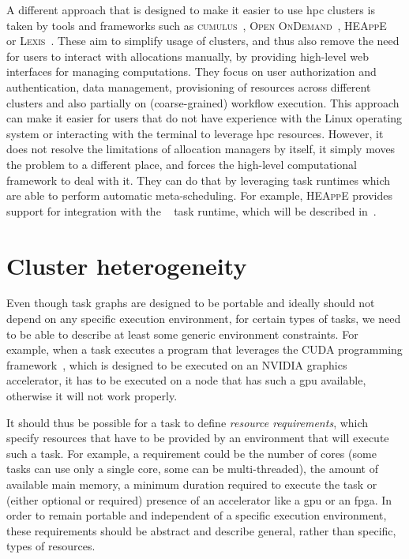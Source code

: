 A different approach that is designed to make it easier to use \gls{hpc} clusters is
taken by tools and frameworks such as \textsc{cumulus}~\cite{cumulus},
\textsc{Open OnDemand}~\cite{openondemand}, \textsc{HEAppE}~\cite{heappe} or
\textsc{Lexis}~\cite{lexis}. These aim to simplify usage of clusters, and thus
also remove the need for users to interact with allocations manually, by providing high-level web
interfaces for managing computations. They focus on user authorization and authentication, data
management, provisioning of resources across different clusters and also partially on
(coarse-grained) workflow execution. This approach can make it easier for users that do not have
experience with the Linux operating system or interacting with the terminal to leverage
\gls{hpc} resources. However, it does not resolve the limitations of allocation
managers by itself, it simply moves the problem to a different place, and forces the high-level
computational framework to deal with it. They can do that by leveraging task runtimes which are
able to perform automatic meta-scheduling. For example, \textsc{HEAppE} provides support
for integration with the \hyperqueue{}~\cite{heappe_hq} task runtime, which will
be described in~.

\section{Cluster heterogeneity}
Even though task graphs are designed to be portable and ideally should not depend on any specific
execution environment, for certain types of tasks, we need to be able to describe at least some
generic environment constraints. For example, when a task executes a program that leverages the
CUDA programming framework~\cite{cuda}, which is designed to be executed on an NVIDIA
graphics accelerator, it has to be executed on a node that has such a \gls{gpu}
available, otherwise it will not work properly.

It should thus be possible for a task to define \emph{resource requirements}, which specify resources
that have to be provided by an environment that will execute such a task. For example, a
requirement could be the number of cores (some tasks can use only a single core, some can be
multi-threaded), the amount of available main memory, a minimum duration required to execute the
task or (either optional or required) presence of an accelerator like a \gls{gpu} or
an \gls{fpga}. In order to remain portable and independent of a specific execution
environment, these requirements should be abstract and describe general, rather than specific,
types of resources.

